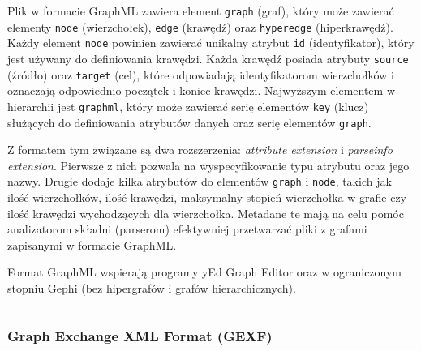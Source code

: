 Plik w formacie GraphML zawiera element \texttt{graph} (graf), który może zawierać elementy \texttt{node} (wierzchołek), \texttt{edge} (krawędź) oraz \texttt{hyperedge} (hiperkrawędź). Każdy element \texttt{node} powinien zawierać unikalny atrybut \texttt{id} (identyfikator), który jest używany do definiowania krawędzi. Każda krawędź posiada atrybuty \texttt{source} (źródło) oraz \texttt{target} (cel), które odpowiadają identyfikatorom wierzchołków i oznaczają odpowiednio początek i koniec krawędzi. Najwyższym elementem w hierarchii jest \texttt{graphml}, który może zawierać serię elementów \texttt{key} (klucz) służących do definiowania atrybutów danych oraz serię elementów \texttt{graph}.

Z formatem tym związane są dwa rozszerzenia: \textit{attribute extension} i \textit{parseinfo extension}. Pierwsze z nich pozwala na wyspecyfikowanie typu atrybutu oraz jego nazwy. Drugie dodaje kilka atrybutów do elementów \texttt{graph} i \texttt{node}, takich jak ilość wierzchołków, ilość krawędzi, maksymalny stopień wierzchołka w grafie czy ilość krawędzi wychodzących dla wierzchołka. Metadane te mają na celu pomóc analizatorom składni (parserom) efektywniej przetwarzać pliki z grafami zapisanymi w formacie GraphML. 

Format GraphML wspierają programy yEd Graph Editor oraz w ograniczonym stopniu Gephi (bez hipergrafów i grafów hierarchicznych).

\vspace*{\fill}
\begin{figure}[h]
\centering
{}
\caption{} \label{fig:example-graph}
\end{figure}
\vspace*{\fill}

\pagebreak

\begin{listing}[H]
    \caption{Reprezentacja grafu z rysunku \ref{fig:example-graph} w formacie GraphML}
    \inputminted{xml}{example.graphml}
    \label{lst:graphml-example}
\end{listing}

\subsubsection{Graph Exchange XML Format (GEXF)}

